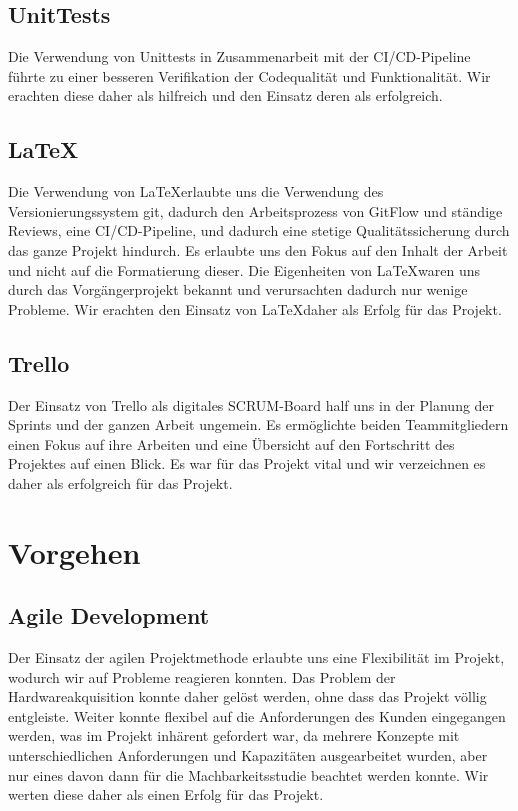 \subsection{UnitTests}
Die Verwendung von Unittests in Zusammenarbeit mit der CI/CD-Pipeline führte zu einer besseren Verifikation der Codequalität und Funktionalität. Wir erachten diese daher als hilfreich und den Einsatz deren als erfolgreich.

\subsection{\LaTeX}
Die Verwendung von \LaTeX erlaubte uns die Verwendung des Versionierungssystem git, dadurch den Arbeitsprozess von GitFlow und ständige Reviews, eine CI/CD-Pipeline, und dadurch eine stetige Qualitätssicherung durch das ganze Projekt hindurch. Es erlaubte uns den Fokus auf den Inhalt der Arbeit und nicht auf die Formatierung dieser. Die Eigenheiten von \LaTeX waren uns durch das Vorgängerprojekt bekannt und verursachten dadurch nur wenige Probleme. Wir erachten den Einsatz von \LaTeX daher als Erfolg für das Projekt.

\subsection{Trello}
Der Einsatz von Trello als digitales SCRUM-Board half uns in der Planung der Sprints und der ganzen Arbeit ungemein. Es ermöglichte beiden Teammitgliedern einen Fokus auf ihre Arbeiten und eine Übersicht auf den Fortschritt des Projektes auf einen Blick. Es war für das Projekt vital und wir verzeichnen es daher als erfolgreich für das Projekt.

\section{Vorgehen}
\subsection{Agile Development}
Der Einsatz der agilen Projektmethode erlaubte uns eine Flexibilität im Projekt, wodurch wir auf Probleme reagieren konnten. Das Problem der Hardwareakquisition konnte daher gelöst werden, ohne dass das Projekt völlig entgleiste. Weiter konnte flexibel auf die Anforderungen des Kunden eingegangen werden, was im Projekt inhärent gefordert war, da mehrere Konzepte mit unterschiedlichen Anforderungen und Kapazitäten ausgearbeitet wurden, aber nur eines davon dann für die Machbarkeitsstudie beachtet werden konnte. Wir werten diese daher als einen Erfolg für das Projekt.

